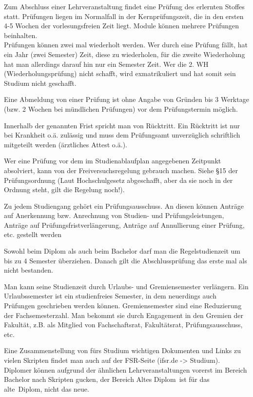 \documentclass[a4paper,12pt]{report}
\begin{document}
\begin{itemize*}
	\item Zum Abschluss einer Lehrveranstaltung findet eine Prüfung des erlernten Stoffes statt.
	Prüfungen liegen im Normalfall in der Kernprüfungszeit, die in den ersten 4-5 Wochen der vorlesungsfreien Zeit liegt.
	Module können mehrere Prüfungen beinhalten.\\
	Prüfungen können zwei mal wiederholt werden.
	Wer durch eine Prüfung fällt, hat ein Jahr (zwei Semester) Zeit, diese zu wiederholen, für die zweite Wiederholung hat man allerdings darauf hin nur ein Semester Zeit.
	Wer die 2. WH (Wiederholungsprüfung) nicht schafft, wird exmatrikuliert und hat somit sein Studium nicht geschafft.
	\item Eine Abmeldung von einer Prüfung ist ohne Angabe von Gründen bis 3 Werktage (bzw. 2 Wochen bei mündlichen Prüfungen) vor dem Prüfungstermin möglich.
	\item Innerhalb der genannten Frist spricht man von Rücktritt.
	Ein Rücktritt ist nur bei Krankheit o.ä. zulässig und muss dem Prüfungsamt unverzüglich schriftlich mitgeteilt werden (ärztliches Attest o.ä.).
	\item Wer eine Prüfung vor dem im Studienablaufplan angegebenen Zeitpunkt absolviert, kann von der Freiversuchsregelung gebrauch machen.
	Siehe \S15 der Prüfungsordnung (Laut Hochschulgesetz abgeschafft, aber da sie noch in der Ordnung steht, gilt die Regelung noch!).
	\item Zu jedem Studiengang gehört ein Prüfungsausschuss.
	An diesen können Anträge auf Anerkennung bzw. Anrechnung von Studien- und Prüfungsleistungen, Anträge auf Prüfungsfristverlängerung, Anträge auf Annullierung einer Prüfung, etc. gestellt werden
	\item Sowohl beim Diplom als auch beim Bachelor darf man die Regelstudienzeit um bis zu 4 Semester überziehen.
	Danach gilt die Abschlussprüfung das erste mal als nicht bestanden.
	\item Man kann seine Studienzeit durch Urlaubs- und Gremiensemester verlängern.
	Ein Urlaubssemester ist ein studienfreies Semester, in dem neuerdings auch Prüfungen geschrieben werden können. 	Gremiensemester sind eine Reduzierung der Fachsemesterzahl.
	Man bekommt sie durch Engagement in den Gremien der Fakultät, z.B. als Mitglied von Fachschaftsrat, Fakultätsrat, Prüfungsausschuss, etc.
	\item Eine Zusammenstellung von fürs Studium wichtigen Dokumenten und Links zu vielen Skripten findet man auch auf der FSR-Seite (ifsr.de -> Studium).
	Diplomer können aufgrund der ähnlichen Lehrveranstaltungen vorerst im Bereich Bachelor nach Skripten gucken, der Bereich \glqq Altes Diplom\grqq\ ist für das \glqq alte\grqq\ Diplom, nicht das neue.

\end{itemize*}
\end{document}

